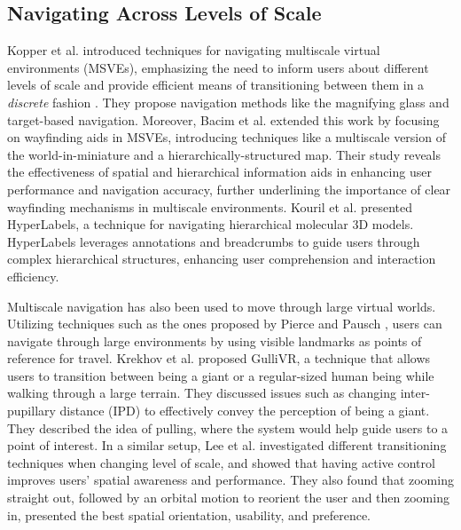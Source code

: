\subsection{Navigating Across Levels of Scale}
Kopper et al. \cite{kopper_design_2006} introduced techniques for navigating multiscale virtual environments (MSVEs), emphasizing the need to inform users about different levels of scale and provide efficient means of transitioning between them in a \textit{discrete} fashion \cite{al_zayer_virtual_2020}. They propose navigation methods like the magnifying glass and target-based navigation. Moreover, Bacim et al. \cite{bacim_wayfinding_2009} extended this work by focusing on wayfinding aids in MSVEs, introducing techniques like a multiscale version of the world-in-miniature \cite{stoakley_virtual_1995, laviola_hands-free_2001, wingrave_overcoming_2006} and a hierarchically-structured map. Their study reveals the effectiveness of spatial and hierarchical information aids in enhancing user performance and navigation accuracy, further underlining the importance of clear wayfinding mechanisms in multiscale environments. Kouril et al. \cite{kouril_hyperlabels_2021} presented HyperLabels, a technique for navigating hierarchical molecular 3D models. HyperLabels leverages annotations and breadcrumbs to guide users through complex hierarchical structures, enhancing user comprehension and interaction efficiency.

Multiscale navigation has also been used to move through large virtual worlds. Utilizing techniques such as the ones proposed by Pierce and Pausch \cite{pierce_navigation_2004}, users can navigate through large environments by using visible landmarks as points of reference for travel. Krekhov et al. \cite{krekhov_gullivr_2018} proposed GulliVR, a technique that allows users to transition between being a giant or a regular-sized human being while walking through a large terrain. They discussed issues such as changing inter-pupillary distance (IPD) to effectively convey the perception of being a giant. They described the idea of pulling, where the system would help guide users to a point of interest. In a similar setup, Lee et al. \cite{lee_designing_2023} investigated different transitioning techniques when changing level of scale, and showed that having active control improves users' spatial awareness and performance. They also found that zooming straight out, followed by an orbital motion to reorient the user and then zooming in, presented the best spatial orientation, usability, and preference.

